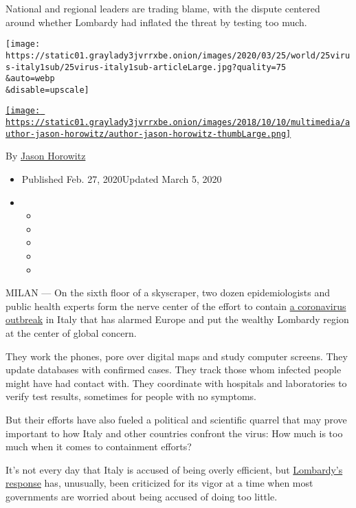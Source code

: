 National and regional leaders are trading blame, with the dispute
centered around whether Lombardy had inflated the threat by testing too
much.

\texttt{[image: https://static01.graylady3jvrrxbe.onion/images/2020/03/25/world/25virus-italy1sub/25virus-italy1sub-articleLarge.jpg?quality=75\\\&auto=webp\\\&disable=upscale]}

\href{https://www.nytimes3xbfgragh.onion/by/jason-horowitz}{\texttt{[image: https://static01.graylady3jvrrxbe.onion/images/2018/10/10/multimedia/author-jason-horowitz/author-jason-horowitz-thumbLarge.png]}}

By \href{https://www.nytimes3xbfgragh.onion/by/jason-horowitz}{Jason
Horowitz}

\begin{itemize}
\item
  Published Feb. 27, 2020Updated March 5, 2020
\item
  \begin{itemize}
  \item
  \item
  \item
  \item
  \item
  \end{itemize}
\end{itemize}

MILAN --- On the sixth floor of a skyscraper, two dozen epidemiologists
and public health experts form the nerve center of the effort to contain
\href{http://www.nytimes3xbfgragh.onion/2020/03/05/world/coronavirus-news.html}{a
coronavirus outbreak} in Italy that has alarmed Europe and put the
wealthy Lombardy region at the center of global concern.

They work the phones, pore over digital maps and study computer screens.
They update databases with confirmed cases. They track those whom
infected people might have had contact with. They coordinate with
hospitals and laboratories to verify test results, sometimes for people
with no symptoms.

But their efforts have also fueled a political and scientific quarrel
that may prove important to how Italy and other countries confront the
virus: How much is too much when it comes to containment efforts?

It's not every day that Italy is accused of being overly efficient, but
\href{https://www.nytimes3xbfgragh.onion/2020/02/24/world/europe/24coronavirus-milan-italy.html}{Lombardy's
response} has, unusually, been criticized for its vigor at a time when
most governments are worried about being accused of doing too little.

